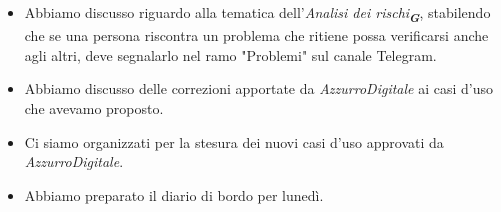 \begin{itemize}
    \item Abbiamo discusso riguardo alla tematica dell'\emph{Analisi dei rischi}\textsubscript{\textit{\textbf{G}}}, stabilendo che se una persona riscontra un problema che ritiene possa verificarsi anche agli altri, deve segnalarlo nel ramo "Problemi" sul canale Telegram.
    \item Abbiamo discusso delle correzioni apportate da \emph{AzzurroDigitale} ai casi d'uso che avevamo proposto.
    \item Ci siamo organizzati per la stesura dei nuovi casi d'uso approvati da \emph{AzzurroDigitale}.
    \item Abbiamo preparato il diario di bordo per lunedì.
\end{itemize}
